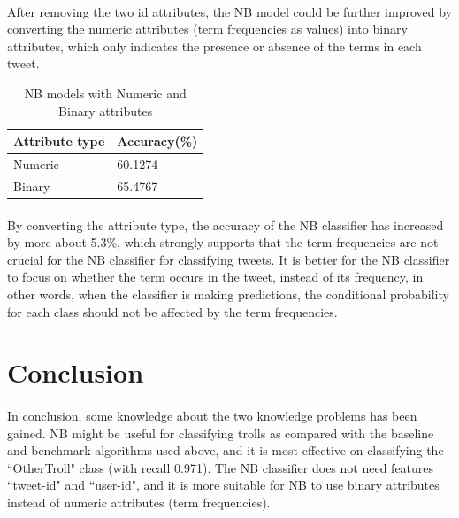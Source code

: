 \documentclass[11pt]{article}
\begin{document}
\paragraph{} After removing the two id attributes, the NB model could be further improved by converting the numeric attributes (term frequencies as values) into binary attributes, which only indicates the presence or absence of the terms in each tweet.
\begin{table}[!htbp]
 \begin{center}
\begin{tabular}{| l | l |}
      \hline
      Attribute type & Accuracy(\%) \\
      \hline\hline
      Numeric & 60.1274 \\
      Binary & 65.4767 \\
      \hline
\end{tabular}
\caption{NB models with Numeric and Binary attributes}\label{table3}
 \end{center}
\end{table}

\paragraph{} By converting the attribute type, the accuracy of the NB classifier has increased by more about 5.3\%, which strongly supports that the term frequencies are not crucial for the NB classifier for classifying tweets. It is better for the NB classifier to focus on whether the term occurs in the tweet, instead of its frequency, in other words, when the classifier is making predictions, the conditional probability for each class should not be affected by the term frequencies.

\section{Conclusion}
\paragraph{} In conclusion, some knowledge about the two knowledge problems has been gained. NB might be useful for classifying trolls as compared with the baseline and benchmark algorithms used above, and it is most effective on classifying the ``OtherTroll" class (with recall 0.971). The NB classifier does not need features ``tweet-id" and ``user-id", and it is more suitable for NB to use binary attributes instead of numeric attributes (term frequencies).

\printbibliography
\end{document}
